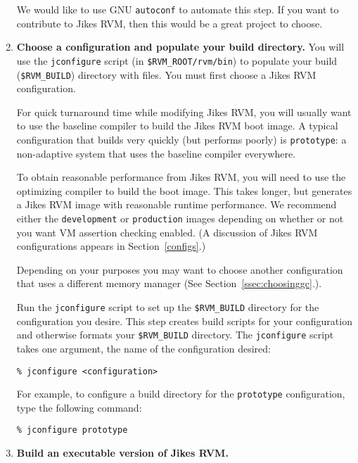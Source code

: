 \begin{enumerate}
We would like to use GNU {\tt autoconf} to automate this
step.  If you want to contribute to Jikes RVM, then this would be a
great project to choose.

\item {\bf Choose a configuration and populate your build directory.}
You will use the {\tt jconfigure} script (in {\tt \$RVM\_ROOT/rvm/bin}) to
populate your build ({\tt \$RVM\_BUILD}) directory with files.  You must
first choose a Jikes RVM configuration.

For quick turnaround time while modifying Jikes RVM, you will usually
want to use the baseline compiler to build the Jikes RVM boot image.
A typical configuration that builds very quickly (but performs poorly)
is {\tt prototype}: a non-adaptive system that uses the
baseline compiler everywhere.

To obtain reasonable performance from Jikes RVM, you will need to use
the optimizing compiler to build the boot image.  This takes longer,
but generates a Jikes RVM image with reasonable runtime performance.
We recommend either the {\tt development} or {\tt production} images
depending on whether or not you want VM assertion checking enabled. (A
discussion  of Jikes RVM configurations appears in
Section~\ref{configs}.) 

Depending on your purposes you may want to choose another
configuration that uses a different memory manager (See
Section~\ref{ssec:choosinggc}.).

Run the {\tt jconfigure} script to set up the {\tt \$RVM\_BUILD}
directory for the configuration you desire.  This step creates
build scripts for your configuration and otherwise formats your
{\tt \$RVM\_BUILD} directory.
The {\tt jconfigure} script takes one argument, the name of the
configuration desired: 

\begin{verbatim}
% jconfigure <configuration>
\end{verbatim}

For example, to configure a build directory for the 
{\tt prototype} configuration, type the following command:

\begin{verbatim}
% jconfigure prototype
\end{verbatim}

\item {\bf Build an executable version of Jikes RVM.}  


\end{enumerate}

